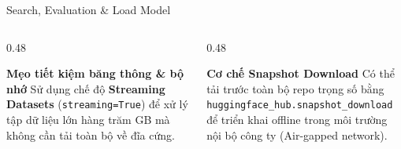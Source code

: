 \documentclass[aspectratio=169, 10pt]{beamer}
\begin{document}
\begin{frame}{Search, Evaluation \& Load Model}
\vspace{0.8em}
\begin{columns}[T]
  \begin{column}{0.48\textwidth}
    \begin{exampleblock}{\textbf{Mẹo tiết kiệm băng thông \& bộ nhớ}}
      Sử dụng chế độ \textbf{Streaming Datasets} (\texttt{streaming=True}) để xử lý tập dữ liệu lớn hàng trăm GB mà không cần tải toàn bộ về đĩa cứng.
    \end{exampleblock}
  \end{column}
  \begin{column}{0.48\textwidth}
    \begin{block}{\textbf{Cơ chế Snapshot Download}}
      Có thể tải trước toàn bộ repo trọng số bằng \texttt{huggingface\_hub.snapshot\_download} để triển khai offline trong môi trường nội bộ công ty (Air-gapped network).
    \end{block}
  \end{column}
\end{columns}
\end{frame}
\end{document}
